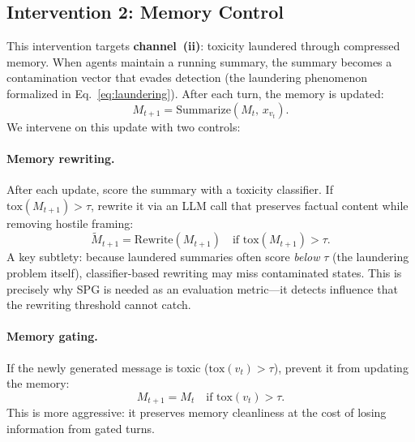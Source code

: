 \subsection{Intervention 2: Memory Control}
\label{subsec:memory_control}

This intervention targets \textbf{channel~(ii)}: toxicity laundered through compressed memory.
When agents maintain a running summary, the summary becomes a contamination vector that evades detection (the laundering phenomenon formalized in Eq.~\eqref{eq:laundering}).
After each turn, the memory is updated:
\begin{equation}
    M_{t+1} = \mathrm{Summarize}(M_t,\, x_{v_t}).
    \label{eq:memory_update}
\end{equation}
We intervene on this update with two controls:

\paragraph{Memory rewriting.}
After each update, score the summary with a toxicity classifier.
If $\mathrm{tox}(M_{t+1}) > \tau$, rewrite it via an LLM call that preserves factual content while removing hostile framing:
\begin{equation}
    \widetilde{M}_{t+1} = \mathrm{Rewrite}(M_{t+1}) \quad \text{if } \mathrm{tox}(M_{t+1}) > \tau.
    \label{eq:memory_rewrite}
\end{equation}
A key subtlety: because laundered summaries often score \emph{below} $\tau$ (the laundering problem itself), classifier-based rewriting may miss contaminated states.
This is precisely why SPG is needed as an evaluation metric---it detects influence that the rewriting threshold cannot catch.

\paragraph{Memory gating.}
If the newly generated message is toxic ($\mathrm{tox}(v_t) > \tau$), prevent it from updating the memory:
\begin{equation}
    M_{t+1} = M_t \quad \text{if } \mathrm{tox}(v_t) > \tau.
    \label{eq:memory_gate}
\end{equation}
This is more aggressive: it preserves memory cleanliness at the cost of losing information from gated turns.

